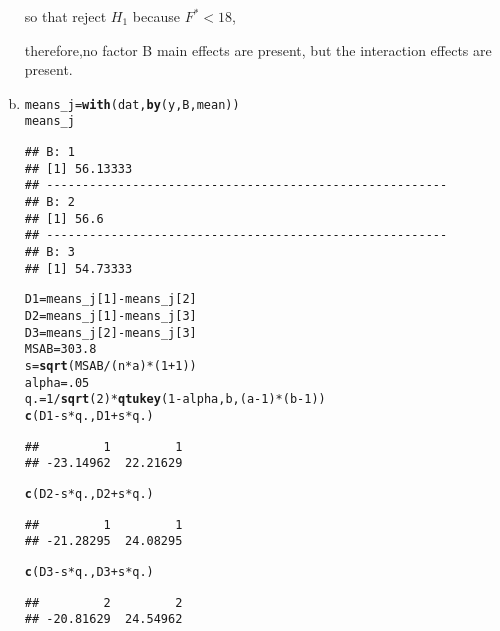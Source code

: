 \documentclass{article}\usepackage[]{graphicx}\usepackage[]{color}
\makeatletter
\newcommand{\hlnum}[1]{\textcolor[rgb]{0.686,0.059,0.569}{#1}}%
\newcommand{\hlopt}[1]{\textcolor[rgb]{0,0,0}{#1}}%
\newcommand{\hlstd}[1]{\textcolor[rgb]{0.345,0.345,0.345}{#1}}%
\newcommand{\hlkwb}[1]{\textcolor[rgb]{0.69,0.353,0.396}{#1}}%
\newcommand{\hlkwd}[1]{\textcolor[rgb]{0.737,0.353,0.396}{\textbf{#1}}}%
\newenvironment{kframe}{%
 \def\at@end@of@kframe{}%
 \ifinner\ifhmode%
  \def\at@end@of@kframe{\end{minipage}}%
  \begin{minipage}{\columnwidth}%
 \fi\fi%
 \def\FrameCommand##1{\hskip\@totalleftmargin \hskip-\fboxsep
 \colorbox{shadecolor}{##1}\hskip-\fboxsep
     \hskip-\linewidth \hskip-\@totalleftmargin \hskip\columnwidth}%
 \MakeFramed {\advance\hsize-\width
   \@totalleftmargin\z@ \linewidth\hsize
   \@setminipage}}%
 {\par\unskip\endMakeFramed%
 \at@end@of@kframe}
\newenvironment{knitrout}{}{} %
\makeatother
\begin{document}
\begin{enumerate}[(a)]
\begin{center}
so that reject $H_1$ because $F^*<18$,

therefore,no factor B main effects are present, but the interaction effects are present.
\end{center}

\item

\begin{knitrout}
\color{fgcolor}\begin{kframe}
\begin{alltt}
  \hlstd{means_j} \hlkwb{=} \hlkwd{with}\hlstd{(dat,} \hlkwd{by}\hlstd{(y, B, mean))}
  \hlstd{means_j}
\end{alltt}
\begin{verbatim}
## B: 1
## [1] 56.13333
## -------------------------------------------------------- 
## B: 2
## [1] 56.6
## -------------------------------------------------------- 
## B: 3
## [1] 54.73333
\end{verbatim}
\begin{alltt}
  \hlstd{D1} \hlkwb{=} \hlstd{means_j[}\hlnum{1}\hlstd{]}\hlopt{-}\hlstd{means_j[}\hlnum{2}\hlstd{]}
  \hlstd{D2} \hlkwb{=} \hlstd{means_j[}\hlnum{1}\hlstd{]}\hlopt{-}\hlstd{means_j[}\hlnum{3}\hlstd{]}
  \hlstd{D3} \hlkwb{=} \hlstd{means_j[}\hlnum{2}\hlstd{]}\hlopt{-}\hlstd{means_j[}\hlnum{3}\hlstd{]}
  \hlstd{MSAB} \hlkwb{=} \hlnum{303.8}
  \hlstd{s} \hlkwb{=} \hlkwd{sqrt}\hlstd{(MSAB}\hlopt{/}\hlstd{(n}\hlopt{*}\hlstd{a)}\hlopt{*}\hlstd{(}\hlnum{1}\hlopt{+}\hlnum{1}\hlstd{))}
  \hlstd{alpha} \hlkwb{=} \hlnum{.05}
  \hlstd{q.} \hlkwb{=} \hlnum{1}\hlopt{/}\hlkwd{sqrt}\hlstd{(}\hlnum{2}\hlstd{)}\hlopt{*}\hlkwd{qtukey}\hlstd{(}\hlnum{1}\hlopt{-}\hlstd{alpha, b, (a}\hlopt{-}\hlnum{1}\hlstd{)}\hlopt{*}\hlstd{(b}\hlopt{-}\hlnum{1}\hlstd{))}
  \hlkwd{c}\hlstd{(D1}\hlopt{-}\hlstd{s}\hlopt{*}\hlstd{q., D1}\hlopt{+}\hlstd{s}\hlopt{*}\hlstd{q.)}
\end{alltt}
\begin{verbatim}
##         1         1 
## -23.14962  22.21629
\end{verbatim}
\begin{alltt}
  \hlkwd{c}\hlstd{(D2}\hlopt{-}\hlstd{s}\hlopt{*}\hlstd{q., D2}\hlopt{+}\hlstd{s}\hlopt{*}\hlstd{q.)}
\end{alltt}
\begin{verbatim}
##         1         1 
## -21.28295  24.08295
\end{verbatim}
\begin{alltt}
  \hlkwd{c}\hlstd{(D3}\hlopt{-}\hlstd{s}\hlopt{*}\hlstd{q., D3}\hlopt{+}\hlstd{s}\hlopt{*}\hlstd{q.)}
\end{alltt}
\begin{verbatim}
##         2         2 
## -20.81629  24.54962
\end{verbatim}
\end{kframe}
\end{knitrout}


\end{enumerate}
\end{document}
